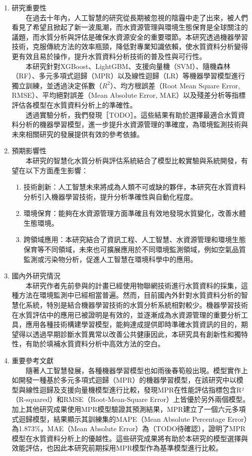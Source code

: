 \documentclass[12pt,a4paper]{article}
\begin{document}
\begin{enumerate}
\begin{enumerate}[label=\arabic*.]
\item 研究重要性\\
　　在過去十年內，人工智慧的研究從長期被忽視的陰霾中走了出來，被人們看見了希望且掀起了新一波風潮\cite{ref2}，而水資源管理與環境生態保育是全球關注的議題，而水質分析與評估是確保水資源安全的重要環節。本研究透過機器學習技術，克服傳統方法的效率瓶頸，降低對專業知識依賴，使水質資料分析變得更有效且易於操作，提升水質資料分析技術的普及性與可行性。\\  
　　本研究針對XGBoost、LightGBM、支援向量機（SVM）、隨機森林（RF）、多元多項式迴歸（MPR）以及線性迴歸（LR）等機器學習模型進行獨立訓練，並透過決定係數（$R^2$）、均方根誤差（Root Mean Square Error, RMSE）、平均絕對誤差（Mean Absolute Error, MAE）以及殘差分析等指標評估各模型在水質資料分析上的準確性。\\  
　　透過實驗分析，我們發現［TODO］。這些結果有助於選擇最適合水質資料分析的機器學習模型，進一步提升水資源管理的準確度，為環境監測技術與未來相關研究的發展提供有效的參考依據。
\item 預期影響性\\
　　本研究的智慧化水質分析與評估系統結合了模型比較實驗與系統開發，有望在以下方面產生影響：
    \begin{enumerate}[label=1-5-\arabic*.]
        \item 技術創新：人工智慧未來將成為人類不可或缺的夥伴\cite{ref3}，本研究在水質資料分析引入機器學習技術，提升分析準確性與自動化程度。
        \item 環境保育：能夠在水資源管理方面準確且有效地發現水質變化，改善水體生態環境。
        \item 跨領域應用：本研究結合了資訊工程、人工智慧、水資源管理和環境生態保育等不同領域，未來也可擴展應用於不同環境監測領域，例如空氣品質監測或污染物分析，促進人工智慧在環境科學中的應用。
    \end{enumerate}
\item 國內外研究情況\\
　　本研究作者先前參與的計畫已經使用物聯網技術進行水質資料的採集，這種方法在環境監測中已經相當普遍。然而，目前國內外針對水質資料分析的智慧化系統，特別是結合機器學習技術的水質分析系統相對較少。機器學習技術在水質評估中的應用已被證明是有效的，並逐漸成為水資源管理的重要分析工具\cite{ref4}，應用各種技術構建學習模型，能夠達成提供即時準確水質資訊的目的，期望得以透過早期診斷水質異常以改善公共健康\cite{ref5}因此，本研究具有創新性和獨特性，有助於填補水質資料分析中高效方法的空白。
\item 重要參考文獻\\
　　隨著人工智慧發展，各種機器學習模型也如雨後春筍般出現。模型實作上如開發一種基於多元多項式迴歸（MPR）的機器學習模型，在該研究中以模型與線性迴歸及支援向量機模型進行比較，發現MPR在性能評估指標包含R²（R-squared）和RMSE（Root-Mean-Square Error）上皆優於另外兩個模型\cite{ref6}。加上其他研究成果使用MPR模型驗證其預測結果\cite{ref7}，MPR建立了一個六元多項式迴歸模型，結果顯示其訓練集的MAPE（Mean Absolute Percentage Error）為1.873\%，MAE（Mean Absolute Error）為（TODO待確認），證明了MPR模型在水質資料分析上的優越性\cite{ref8}。這些研究成果將有助於本研究的模型選擇與效能評估，也因此本研究前期採用MPR模型作為基準模型進行比較。\\

\end{enumerate}
\end{enumerate}
\end{document}
